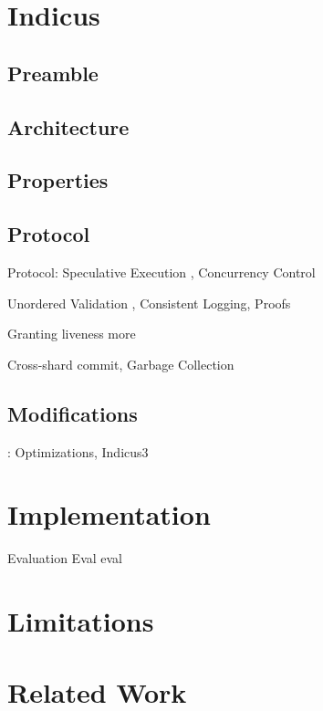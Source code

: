 \documentclass[letterpaper,twocolumn,10pt]{article}
\begin{document}
\section{Indicus} 
\subsection{Preamble}
\newpage
\subsection{Architecture}
\newpage
\subsection{Properties}
\newpage
\subsection{Protocol}

Protocol: 
Speculative Execution \newpage, Concurrency Control \newpage

Unordered Validation \newpage, Consistent Logging, \newpage Proofs \newpage

Granting liveness \newpage more \newpage

Cross-shard commit, Garbage Collection \newpage

\subsection{Modifications}: Optimizations, Indicus3 \newpage

\section{Implementation} 
Evaluation \newpage
Eval \newpage
eval \newpage
\section{Limitations} 
\newpage
\section{Related Work} 
\newpage
\end{document}
